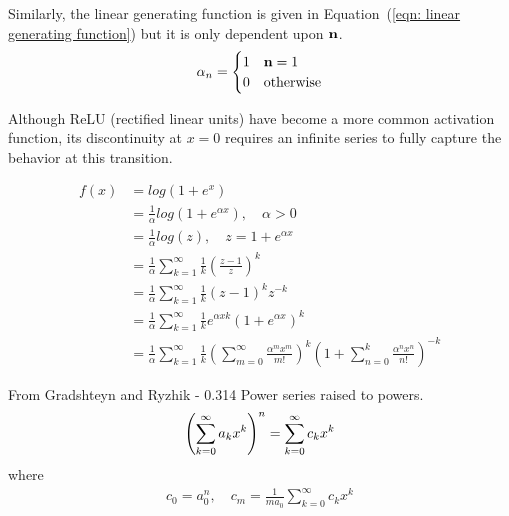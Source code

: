 Similarly, the linear generating function is given in Equation~(\ref{eqn: linear generating function}) but it is only dependent upon $\bold n$.
\begin{equation}
	\alpha_n =
		\begin{cases}
			1 & \bold n = 1 \\
			0 & \text{otherwise}
		\end{cases}
	\label{eqn: linear generating function}
\end{equation}

Although ReLU (rectified linear units) have become a more common activation function, its discontinuity at $x = 0$ requires an infinite series to fully capture the behavior at this transition.

\begin{align*}
	f(x) & = log(1+e^x)\\
	& = \frac{1}{\alpha}log(1+e^{\alpha x}), \quad \alpha > 0 \\
	& = \frac{1}{\alpha}log(z), \quad z = 1 + e^{\alpha x} \\
	& = \frac{1}{\alpha}\sum\limits_{k=1}^\infty
	\frac{1}{k}\left(\frac{z-1}{z}\right)^k \\
	& = \frac{1}{\alpha}\sum\limits_{k=1}^\infty
	\frac{1}{k}(z-1)^{k} z^{-k} \\
	& = \frac{1}{\alpha}\sum\limits_{k=1}^\infty
	\frac{1}{k} e^{\alpha x k} (1 + e^{\alpha x})^{k} \\
	& = \frac{1}{\alpha}\sum\limits_{k=1}^\infty
	\frac{1}{k} \left(\sum\limits_{m=0}^\infty
	\frac{\alpha^{m} x^{m}}{m!}\right)^k \left(1 + \sum\limits_{n=0}^{k} \frac{\alpha^{n} x^{n}}{n!}\right)^{-k}
\end{align*}

From Gradshteyn and Ryzhik - 0.314 Power series raised to powers.
\begin{equation}
	\left(\sum\limits_{k=0}^{\infty}a_{k}x^{k}\right)^{n} = \sum\limits_{k=0}^{\infty}c_{k}x^{k} \\
	\label{eqn:power series raised to powers}
\end{equation}
where
\begin{align*}
	c_{0} = a_{0}^{n}, \quad c_{m} = \frac{1}{ma_{0}}\sum\limits_{k=0}^{\infty}c_{k}x^{k}
\end{align*}

